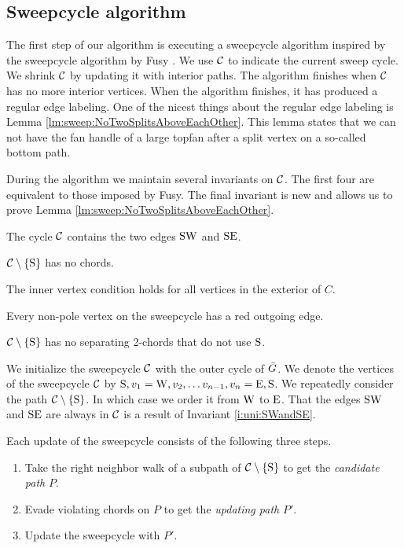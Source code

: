 
\subsection{Sweepcycle algorithm}
\thispagestyle{plain}
\label{ss:sweep}
The first step of our algorithm is executing a sweepcycle algorithm inspired by the sweepcycle algorithm by Fusy \cite{Fusy2006}. We use $\mathcal{C}$ to indicate the current sweep cycle. We shrink $\mathcal{C}$ by updating it with interior paths.
The algorithm finishes when $\mathcal{C}$ has no more interior vertices. When the algorithm finishes, it has produced a regular edge labeling.
One of the nicest things about the regular edge labeling is Lemma \ref{lm:sweep:NoTwoSplitsAboveEachOther}.
This lemma states that we can not have the fan handle of a large topfan after a split vertex on a so-called bottom path.

During the algorithm we maintain several invariants on $\mathcal{C}$. The first four are equivalent to those imposed by Fusy. The final invariant is new and allows us to prove Lemma \ref{lm:sweep:NoTwoSplitsAboveEachOther}.

\begin{invariants}
  \itemsep=-4pt
  \item \label{i:uni:SWandSE} The cycle $\mathcal{C}$ contains the two edges $\mathrm{S} \mathrm{W}$ and $\mathrm{S} \mathrm{E}$.
  \item \label{i:uni:noChords} $\mathcal{C} \setminus \left\lbrace {\mathrm{S}} \right\rbrace$ has no chords.
  \item \label{i:uni:intVertCond} The inner vertex condition holds for all vertices in the exterior of $C$.
  \item \label{i:uni:redOutgoing} Every non-pole vertex on the sweepcycle has a red outgoing edge.
  \item \label{i:uni:no2Chords} $\mathcal{C}\setminus \left\lbrace {\mathrm{S}} \right\rbrace$ has no separating 2-chords that do not use $\mathrm{S}$.
\end{invariants}

We initialize the sweepcycle $\mathcal{C}$ with the outer cycle of $\bar{G}$.
We denote the vertices of the sweepcycle $\mathcal{C}$ by $\mathrm{S}, v_1 = \mathrm{W}, v_2, \ldots v_{n-1}, v_n = \mathrm{E}, \mathrm{S}$.
We repeatedly consider the path $\mathcal{C} \setminus \left\lbrace {\mathrm{S}} \right\rbrace$.
In which case we order it from $\mathrm{W}$ to $\mathrm{E}$. That the edges $\mathrm{S} \mathrm{W}$ and $\mathrm{S} \mathrm{E}$ are always in $\mathcal{C}$ is a result of Invariant \ref{i:uni:SWandSE}.


Each update of the sweepcycle consists of the following three steps.
\begin{enumerate}
  \itemsep=-4pt
  \item Take the right neighbor walk of a subpath of $\mathcal{C} \setminus \left\lbrace {\mathrm{S}} \right\rbrace$ to get the \emph{candidate path} $P$.
  \item Evade violating chords on $P$ to get the \emph{updating path} $P'$.
  \item Update the sweepcycle with $P'$.
\end{enumerate}

